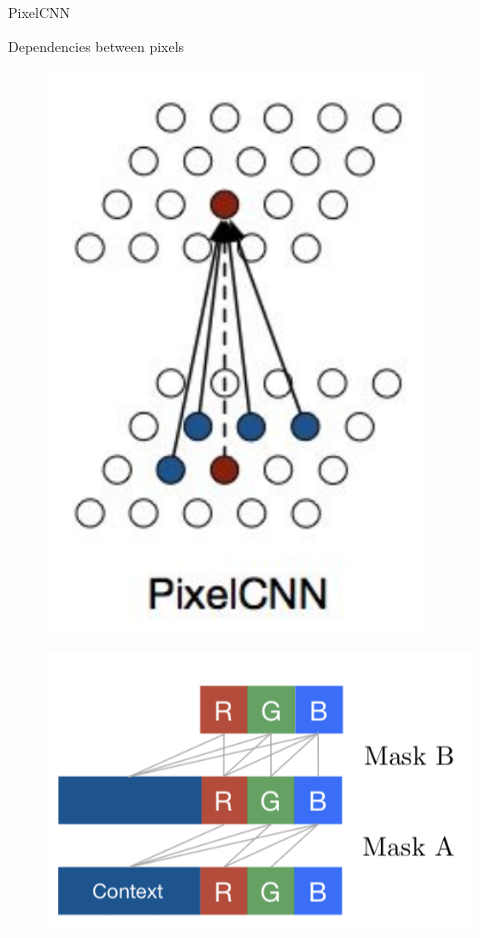 \begin{frame}{PixelCNN}
\begin{minipage}[t]{0.5\columnwidth}
\begin{block}{Dependencies between pixels}
\begin{figure}
		        \includegraphics[width=0.5\linewidth]{figs/pixelcnn_0_2.png}
			\end{figure}
			\vspace{-0.3cm}
			\begin{figure}
				\centering
		        \includegraphics[width=0.65\linewidth]{figs/pixelcnn2.png}
			\end{figure}
		\end{block}
	\end{minipage}
\end{frame}
